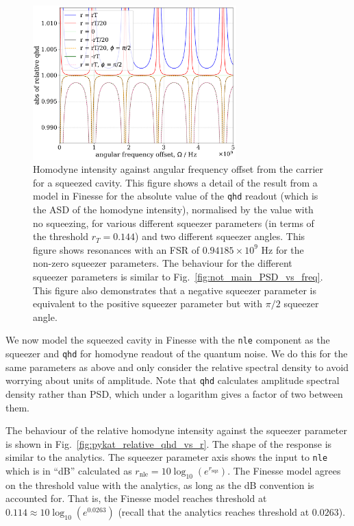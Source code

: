 \documentclass[aps,pra,superscriptaddress,reprint,nofootinbib]{revtex4-1}
\newcommand{\code}[1]{\texttt{#1}}
\begin{document}
\begin{figure}
	\begin{center}
	\includegraphics[width=0.7\textwidth]{figures/pykat_relative_qhd_vs_freq.pdf}
	\end{center}
	\caption{Homodyne intensity against angular frequency offset from the carrier for a squeezed cavity. This figure shows a detail of the result from a model in Finesse for the absolute value of the \code{qhd} readout (which is the ASD of the homodyne intensity), normalised by the value with no squeezing, for various different squeezer parameters (in terms of the threshold $r_T = 0.144$) and two different squeezer angles. This figure shows resonances with an FSR of $0.94185 \times 10^9$ Hz for the non-zero squeezer parameters. The behaviour for the different squeezer parameters is similar to Fig.~\ref{fig:not_main_PSD_vs_freq}. This figure also demonstrates that a negative squeezer parameter is equivalent to the positive squeezer parameter but with $\pi/2$ squeezer angle.}
	\label{fig:pykat_relative_qhd_vs_freq}
\end{figure}

We now model the squeezed cavity in Finesse with the \code{nle} component as the squeezer and \code{qhd} for homodyne readout of the quantum noise. We do this for the same parameters as above and only consider the relative spectral density to avoid worrying about units of amplitude. Note that \code{qhd} calculates amplitude spectral density rather than PSD, which under a logarithm gives a factor of two between them.


The behaviour of the relative homodyne intensity against the squeezer parameter is shown in Fig.~\ref{fig:pykat_relative_qhd_vs_r}. The shape of the response is similar to the analytics. The squeezer parameter axis shows the input to \code{nle} which is in ``dB'' calculated as $r_{\mathrm{nle}} = 10 \log_{10}(e^{r_\mathrm{sqz}})$. The Finesse model agrees on the threshold value with the analytics, as long as the dB convention is accounted for. That is, the Finesse model reaches threshold at $0.114 \approx 10 \log_{10}(e^{0.0263})$ (recall that the analytics reaches threshold at $0.0263$).
\end{document}
